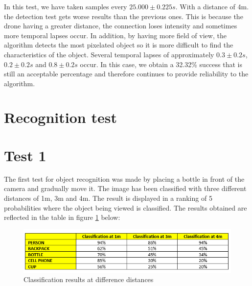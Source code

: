 In this test, we have taken samples every \begin{math}25.000\pm0.225 s.\end{math} With a distance of 4m. the detection test gets worse results than the previous ones. This is because the drone having a greater distance, the connection loses intensity and sometimes more temporal lapses occur. In addition, by having more field of view, the algorithm detects the most pixelated object so it is more difficult to find the characteristics of the object. Several temporal lapses of approximately \begin{math}0.3\pm0.2 s\end{math}, \begin{math}0.2\pm0.2 s\end{math} and \begin{math}0.8\pm0.2 s\end{math} occur. In this case, we obtain a 32.32\% success that is still an acceptable percentage and therefore continues to provide reliability to the algorithm.


\section{Recognition test}

\section{Test 1}
The first test for object recognition was made by placing a bottle in front of the camera and gradually move it. The image has been classified with three different distances of 1m, 3m and 4m. The result is displayed in a ranking of 5 probabilities where the object being viewed is classified. The results obtained are reflected in the table in figure \ref{classification_table} below: 


\begin{figure}[ht]
\centering
\includegraphics[scale=0.8]{figures/recognition_table_1.png}
\caption{Classification results at difference distances}
\label{classification_table}
\end{figure}


